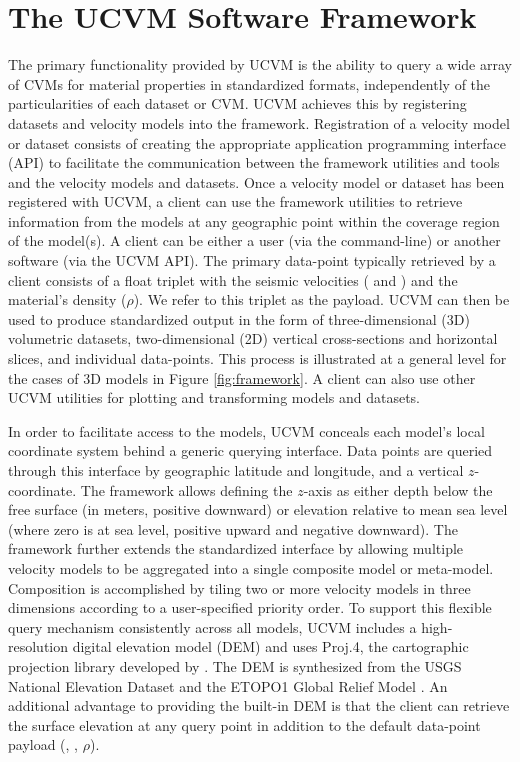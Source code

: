 






\section{The UCVM Software Framework}\label{sec:ucvm}

The primary functionality provided by UCVM is the ability to query a wide array of CVMs for material properties in standardized formats, independently of the particularities of each dataset or CVM. UCVM achieves this by registering datasets and velocity models into the framework. Registration of a velocity model or dataset consists of creating the appropriate application programming interface (API) to facilitate the communication between the framework utilities and tools and the velocity models and datasets. Once a velocity model or dataset has been registered with UCVM, a client can use the framework utilities to retrieve information from the models at any geographic point within the coverage region of the model(s). A client can be either a user (via the command-line) or another software (via the UCVM API). The primary data-point typically retrieved by a client consists of a float triplet with the seismic velocities (\vp{} and \vs{}) and the material's density ($\rho$). We refer to this triplet as the payload. UCVM can then be used to produce standardized output in the form of three-dimensional (3D) volumetric datasets, two-dimensional (2D) vertical cross-sections and horizontal slices, and individual data-points. This process is illustrated at a general level for the cases of 3D models in Figure \ref{fig:framework}. A client can also use other UCVM utilities for plotting and transforming models and datasets.

In order to facilitate access to the models, UCVM conceals each model's local coordinate system behind a generic querying interface. Data points are queried through this interface by geographic latitude and longitude, and a vertical $z$-coordinate. The framework allows defining the $z$-axis as either depth below the free surface (in meters, positive downward) or elevation relative to mean sea level (where zero is at sea level, positive upward and negative downward). The framework further extends the standardized interface by allowing multiple velocity models to be aggregated into a single composite model or meta-model. Composition is accomplished by tiling two or more velocity models in three dimensions according to a user-specified priority order. To support this flexible query mechanism consistently across all models, UCVM includes a high-resolution digital elevation model (DEM) and uses Proj.4, the cartographic projection library developed by \citet{Evenden_2003_Manual}. The DEM is synthesized from the USGS National Elevation Dataset \citep{Gesch_2002_PERS, Gesch_2007_Chap} and the ETOPO1 Global Relief Model \citep{Amante_2009_Manual}. An additional advantage to providing the built-in DEM is that the client can retrieve the surface elevation at any query point in addition to the default data-point payload (\vp{}, \vs{}, $\rho$).


